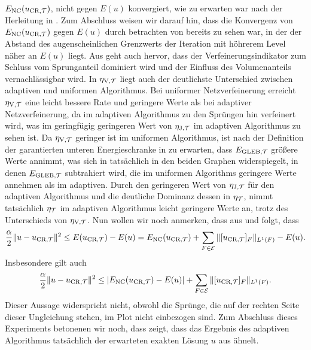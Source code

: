 $E_\textup{NC}(u_{\textup{CR}, \mathcal{T}})$, nicht gegen $E(u)$ konvergiert, wie zu erwarten war nach der
Herleitung in .
Zum Abschluss weisen wir darauf hin, dass die Konvergenz von $E_\textup{NC}(u_{\textup{CR}, \mathcal{T}})$
gegen $E(u)$ durch betrachten von  bereits zu
sehen war, in der der Abstand des augenscheinlichen Grenzwerts der Iteration
mit höhrerem Level näher an $E(u)$ liegt.
Aus  geht auch hervor, dass der Verfeinerungsindikator
zum Schluss vom Sprunganteil dominiert wird und der Einfluss des Volumenanteils
vernachlässigbar wird.
In $\eta_{\textup{V}, \mathcal{T}}$ liegt auch der deutlichste Unterschied zwischen adaptiven und
uniformen Algorithmus. Bei uniformer Netzverfeinerung erreicht $\eta_{\textup{V}, \mathcal{T}}$ eine
leicht bessere Rate und geringere Werte als bei adaptiver Netzverfeinerung,
da im adaptiven Algorithmus zu den Sprüngen hin verfeinert wird, was im 
geringfügig geringeren Wert von $\eta_{\textup{J}, \mathcal{T}}$ im adaptiven Algorithmus zu sehen ist.
Da $\eta_{\textup{V}, \mathcal{T}}$ geringer ist im uniformen Algorithmus, ist nach der Definition der
garantierten unteren Energieschranke in  zu erwarten, dass
$E_{\textup{GLEB}, \mathcal{T}}$ größere Werte annimmt, was sich in 
tatsächlich in den beiden Graphen widerspiegelt, in denen $E_{\textup{GLEB}, \mathcal{T}}$ subtrahiert
wird, die im uniformen Algorithms geringere Werte annehmen als im adaptiven.
Durch den geringeren Wert von $\eta_{\textup{J}, \mathcal{T}}$ für den adaptiven Algorithmus und die
deutliche Dominanz dessen in $\eta_{\mathcal{T}}$, nimmt tatsächlich $\eta_{\mathcal{T}}$ im adaptiven
Algorithmus leicht geringere Werte an, trotz des Unterschieds von $\eta_{\textup{V}, \mathcal{T}}$.
Nun wollen wir noch anmerken, dass aus  und
 folgt, dass
\begin{align*}
  \frac{\alpha}{2}\Vert u-u_{\textup{CR}, \mathcal{T}}\Vert^2\leq
  E(u_{\textup{CR}, \mathcal{T}})-E(u)=E_\textup{NC}(u_{\textup{CR}, \mathcal{T}})+\sum_{F\in\mathcal{E}}\Vert[u_{\textup{CR}, \mathcal{T}}]_F\Vert_{L^1(F)}-E(u).
\end{align*}
Insbesondere gilt auch 
\begin{align*}
  \frac{\alpha}{2}\Vert u-u_{\textup{CR}, \mathcal{T}}\Vert^2
  \leq
  \left|E_\textup{NC}(u_{\textup{CR}, \mathcal{T}})-E(u)\right|+
  \sum_{F\in\mathcal{E}}\Vert[u_{\textup{CR}, \mathcal{T}}]_F\Vert_{L^1(F)}.
\end{align*}
Dieser Aussage widerspricht  nicht, obwohl die Sprünge,
die auf der rechten Seite dieser Ungleichung stehen, im Plot nicht einbezogen
sind.
Zum Abschluss dieses Experiments betonenen wir noch, dass
 zeigt, dass das Ergebnis des adaptiven Algorithmus
tatsächlich der erwarteten exakten Lösung $u$ aus  ähnelt.

